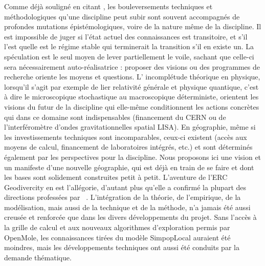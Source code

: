 Comme déjà souligné en citant , les bouleversements techniques et méthodologiques qu'une discipline peut subir sont souvent accompagnés de profondes mutations épistémologiques, voire de la nature même de la discipline. Il est impossible de juger si l'état actuel des connaissances est transitoire, et s'il l'est quelle est le régime stable qui terminerait la transition s'il en existe un. La spéculation est le seul moyen de lever partiellement le voile, sachant que celle-ci sera nécessairement auto-réalisatrice : proposer des visions ou des programmes de recherche oriente les moyens et questions. L' incomplétude théorique en physique, lorsqu'il s'agit par exemple de lier relativité générale et physique quantique, c'est à dire le microscopique stochastique au macroscopique déterministe, orientent les visions du futur de la discipline qui elle-même conditionnent les actions concrètes qui dans ce domaine sont indispensables (financement du CERN ou de l'interféromètre d'ondes gravitationnelles spatial LISA). En géographie, même si les investissements techniques sont incomparables, ceux-ci existent (accès aux moyens de calcul, financement de laboratoires intégrés, etc.) et sont déterminés également par les perspectives pour la discipline. Nous proposons ici une vision et un manifeste d'une nouvelle géographie, qui est déjà en train de se faire et dont les bases sont solidement construites petit à petit. L'aventure de l'ERC Geodivercity en est l'allégorie, d'autant plus qu'elle a confirmé la plupart des directions professées par ~\cite{banos2017knowledge}. L'intégration de la théorie, de l'empirique, de la modélisation, mais aussi de la technique et de la méthode, n'a jamais été aussi creusée et renforcée que dans les divers développements du projet. Sans l'accès à la grille de calcul et aux nouveaux algorithmes d'exploration permis par OpenMole, les connaissances tirées du modèle SimpopLocal auraient été moindres, mais les développements techniques ont aussi été conduits par la demande thématique.


